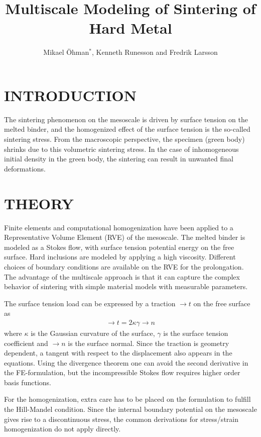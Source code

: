 \documentclass{nordic}
\title{Multiscale Modeling of Sintering of Hard Metal}
\author{Mikael Öhman$^*$, Kenneth Runesson and Fredrik Larsson}
\begin{document}
\maketitle

\section{INTRODUCTION}
The sintering phenomenon on the mesoscale is driven by surface tension on the melted binder, and
the homogenized effect of the surface tension is the so-called sintering stress.
From the macroscopic perspective, the specimen (green body) shrinks due to this volumetric sintering stress. In the case of inhomogeneous
initial density in the green body, the sintering can result in unwanted final deformations.

\section{THEORY}
Finite elements and computational homogenization have been applied to a Representative Volume Element (RVE) of the mesoscale.
The melted binder is modeled as a Stokes flow, with surface tension potential energy on the free surface. Hard inclusions are modeled by applying a high viscosity.
Different choices of boundary conditions are available on the RVE for the prolongation.
The advantage of the multiscale approach is that it can capture the complex behavior of sintering with simple material models with measurable parameters.

The surface tension load can be expressed by a traction $\to t$ on the free surface as
\begin{gather}
 \to t = 2\kappa\gamma \to n
\end{gather}
where $\kappa$ is the Gaussian curvature of the surface, $\gamma$ is the surface tension coefficient and $\to n$ is the surface normal. %
Since the traction is geometry dependent, a tangent with respect to the displacement also appears in the equations.
Using the divergence theorem one can avoid the second derivative in the FE-formulation,
but the incompressible Stokes flow requires higher order basis functions.

For the homogenization, extra care has to be placed on the formulation to fulfill the Hill-Mandel condition.
Since the internal boundary potential on the mesoscale gives rise to a discontinuous stress,
the common derivations for stress/strain homogenization do not apply directly.
\end{document}
